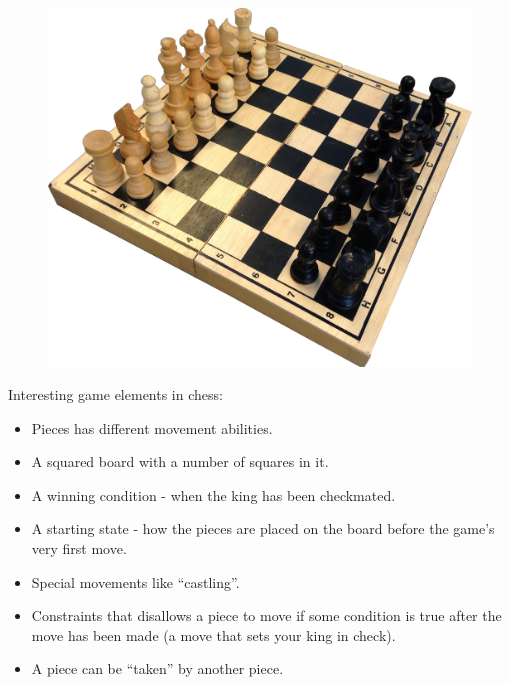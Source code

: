 \begin{figure}
	\centering
		\includegraphics[scale=0.1]{pictures/chess.png}
\label{fig:chess}
\end{figure}

Interesting game elements in chess:
\begin{itemize}[noitemsep]
\item Pieces has different movement abilities.
\item A squared board with a number of squares in it.
\item A winning condition - when the king has been checkmated.
\item A starting state - how the pieces are placed on the board before the game's very first move.
\item Special movements like ``castling''.
\item Constraints that disallows a piece to move if some condition is true after the move has been made (a move that sets your king in check).
\item A piece can be ``taken'' by another piece.
\end{itemize}